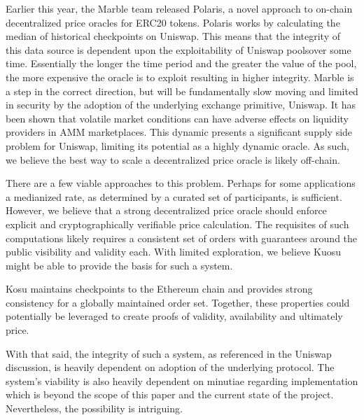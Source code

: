\documentclass[10pt]{article}
\begin{document}
Earlier this year, the Marble team released Polaris, a novel approach to on-chain decentralized price oracles for ERC20 tokens. Polaris works by calculating the median of historical checkpoints on Uniswap. This means that the integrity of this data source is dependent upon the exploitability of Uniswap poolsover some time. Essentially the longer the time period and the greater the value of the pool, the more expensive the oracle is to exploit resulting in higher integrity. Marble is a step in the correct direction, but will be fundamentally slow moving and limited in security by the adoption of the underlying exchange primitive, Uniswap. It has been shown that volatile market conditions can have adverse effects on liquidity providers in AMM marketplaces. This dynamic presents a significant supply side problem for Uniswap, limiting its potential as a highly dynamic oracle. As such, we believe the best way to scale a decentralized price oracle is likely off-chain.
\medskip

There are a few viable approaches to this problem. Perhaps for some applications a medianized rate, as determined by a curated set of participants, is sufficient. However, we believe that a strong decentralized price oracle should enforce explicit and cryptographically verifiable price calculation. The requisites of such computations likely requires a consistent set of orders with guarantees around the public visibility and validity each. With limited exploration, we believe Kuosu might be able to provide the basis for such a system.
\medskip

Kosu maintains checkpoints to the Ethereum chain and provides strong consistency for a globally maintained order set. Together, these properties could potentially be leveraged to create proofs of validity, availability and ultimately price.
\medskip

With that said, the integrity of such a system, as referenced in the Uniswap discussion, is heavily dependent on adoption of the underlying protocol. The system’s viability is also heavily dependent on minutiae regarding implementation which is beyond the scope of this paper and the current state of the project. Nevertheless, the possibility is intriguing.
\clearpage
\pagebreak

\end{document}
